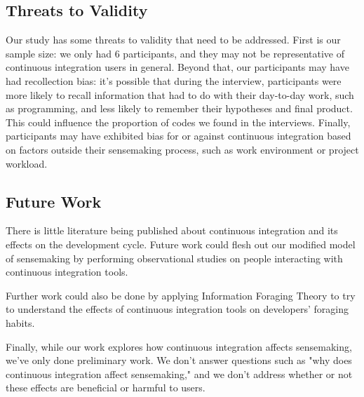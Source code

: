 \documentclass{sig-alternate}
\begin{document}
\subsection{Threats to Validity}
Our study has some threats to validity that need to be addressed. First is our sample size: we only had 6 participants, and they may not be representative of continuous integration users in general. Beyond that, our participants may have had recollection bias: it's possible that during the interview, participants were more likely to recall information that had to do with their day-to-day work, such as programming, and less likely to remember their hypotheses and final product. This could influence the proportion of codes we found in the interviews. Finally, participants may have exhibited bias for or against continuous integration based on factors outside their sensemaking process, such as work environment or project workload.
\subsection{Future Work}
There is little literature being published about continuous integration and its effects on the development cycle. Future work could flesh out our modified model of sensemaking by performing observational studies on people interacting with continuous integration tools. 

Further work could also be done by applying Information Foraging Theory to try to understand the effects of continuous integration tools on developers' foraging habits. 

Finally, while our work explores how continuous integration affects sensemaking, we've only done preliminary work. We don't answer questions such as "why does continuous integration affect sensemaking," and we don't address whether or not these effects are beneficial or harmful to users. 
\end{document}
